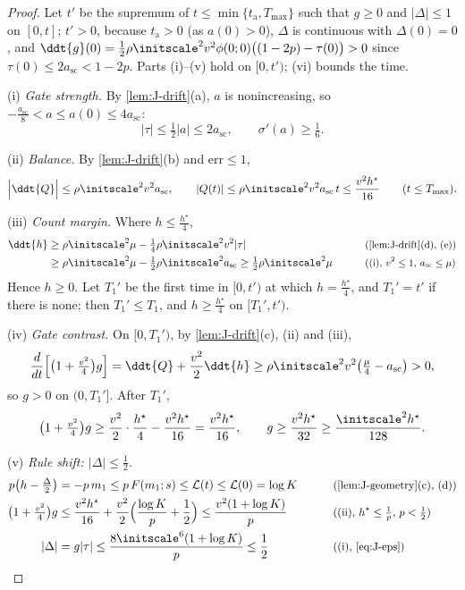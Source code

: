 \begin{proof}
Let $t'$ be the supremum of $t\le\min\{t_{\mathrm a},T_{\max}\}$ such that $g\ge0$ and $|\Delta|\le1$ on $[0,t]$; $t'>0$, because $t_{\mathrm a}>0$ (as $a(0)>0$), $\Delta$ is continuous with $\Delta(0)=0$, and
$\ddt{g}(0)=\frac{1}{2}\rho\initscale^2v^2\phi(0;0)\bigl((1-2p)-\tau(0)\bigr)>0$ since $\tau(0)\le2a_{\mathrm{sc}}<1-2p$. Parts (i)--(v) hold on $[0,t')$; (vi) bounds the time.

\smallskip\noindent(i) \emph{Gate strength.} By \cref{lem:J-drift}(a), $a$ is nonincreasing, so $-\frac{a_{\mathrm{sc}}}{8}<a\le a(0)\le4a_{\mathrm{sc}}$:
\[
 |\tau|\le\tfrac{1}{2}|a|\le2a_{\mathrm{sc}},\qquad \sigma'(a)\ge\tfrac{1}{6}.
\]

\noindent(ii) \emph{Balance.} By \cref{lem:J-drift}(b) and $\mathrm{err}\le1$,
\[
 \Bigl|\ddt{Q}\Bigr|\le\rho\initscale^2v^2a_{\mathrm{sc}},\qquad |Q(t)|\le\rho\initscale^2v^2a_{\mathrm{sc}}\,t\le\frac{v^2h^\star}{16}\qquad(t\le T_{\max}).
\]

\noindent(iii) \emph{Count margin.} Where $h\le\frac{h^\star}{4}$,
\begin{alignat*}{2}
 \ddt{h}&\ge\rho\initscale^2\mu-\tfrac{1}{4}\rho\initscale^2v^2|\tau| &\qquad& \why{\cref{lem:J-drift}(d), (e)}\\
 &\ge\rho\initscale^2\mu-\tfrac{1}{2}\rho\initscale^2a_{\mathrm{sc}}\ge\tfrac{1}{2}\rho\initscale^2\mu && \why{(i), $v^2\le1$, $a_{\mathrm{sc}}\le\mu$}
\end{alignat*}
Hence $h\ge0$. Let $T_1'$ be the first time in $[0,t')$ at which $h=\frac{h^\star}{4}$, and $T_1'=t'$ if there is none; then $T_1'\le T_1$, and $h\ge\frac{h^\star}{4}$ on
$[T_1',t')$.

\noindent(iv) \emph{Gate contrast.} On $[0,T_1')$, by \cref{lem:J-drift}(c), (ii) and (iii),
\[
 \frac{d}{dt}\Bigl[\bigl(1+\tfrac{v^2}{4}\bigr)g\Bigr]=\ddt{Q}+\frac{v^2}{2}\ddt{h}\ge\rho\initscale^2v^2\bigl(\tfrac{\mu}{4}-a_{\mathrm{sc}}\bigr)>0,
\]
so $g>0$ on $(0,T_1']$. After $T_1'$,
\[
 \bigl(1+\tfrac{v^2}{4}\bigr)g\ge\frac{v^2}{2}\cdot\frac{h^\star}{4}-\frac{v^2h^\star}{16}=\frac{v^2h^\star}{16},\qquad g\ge\frac{v^2h^\star}{32}\ge\frac{\initscale^2h^\star}{128} .
\]

\noindent(v) \emph{Rule shift: $|\Delta|\le\frac{1}{2}$.}
\begin{alignat*}{2}
 p\bigl(h-\tfrac{\Delta}{2}\bigr)&=-p\,m_1\le p\,F(m_1;s)\le\mathcal L(t)\le\mathcal L(0)=\log K &\qquad& \why{\cref{lem:J-geometry}(c), (d)}\\
 \bigl(1+\tfrac{v^2}{4}\bigr)g&\le\frac{v^2h^\star}{16}+\frac{v^2}{2}\Bigl(\frac{\log K}{p}+\frac{1}{2}\Bigr)\le\frac{v^2(1+\log K)}{p} && \why{(ii), $h^\star\le\tfrac{1}{p}$, $p<\tfrac{1}{2}$}\\
 |\Delta|&=g|\tau|\le\frac{8\initscale^6(1+\log K)}{p}\le\frac{1}{2} && \why{(i), \cref{eq:J-eps}}
\end{alignat*}


\end{proof}
